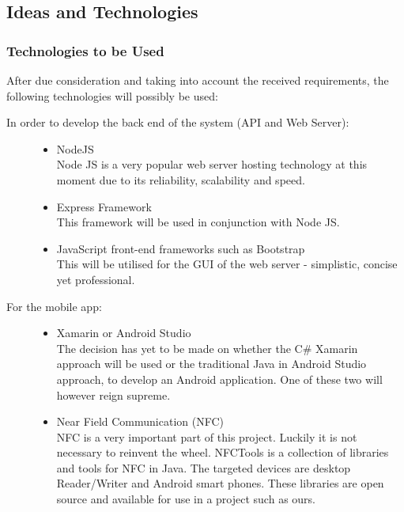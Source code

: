 \subsection{Ideas and Technologies}
\subsubsection{Technologies to be Used}
After due consideration and taking into account the received requirements, the following technologies will possibly be used:
\begin{description}
	\item[In order to develop the back end of the system (API and Web Server):]\hfill
		\begin{itemize}
			\item{NodeJS}\hfill\\
			Node JS is a very popular web server hosting technology at this moment due 
			to its reliability, scalability and speed.
			\item{Express Framework}\hfill\\
			This framework will be used in conjunction with Node JS.
			\item{JavaScript front-end frameworks such as Bootstrap}\hfill\\
			This will be utilised for the GUI of the web server - simplistic, concise yet professional.
		\end{itemize}		
		
	\item[For the mobile app:]\hfill
	\begin{itemize}
		\item{Xamarin or Android Studio}\hfill\\
		The decision has yet to be made on whether the C\# Xamarin approach will be used or the traditional Java in Android Studio approach, to develop an Android application. One of these two will however reign supreme.
	
	
	\item{Near Field Communication (NFC)}\\
	NFC is a very important part of this project. Luckily it is not necessary to reinvent the wheel. NFCTools is a collection of libraries and tools for NFC in Java. The targeted devices are desktop Reader/Writer and Android smart phones. These libraries are open source and available for use in a project such as ours.
	\end{itemize}
	
\end{description}
	
